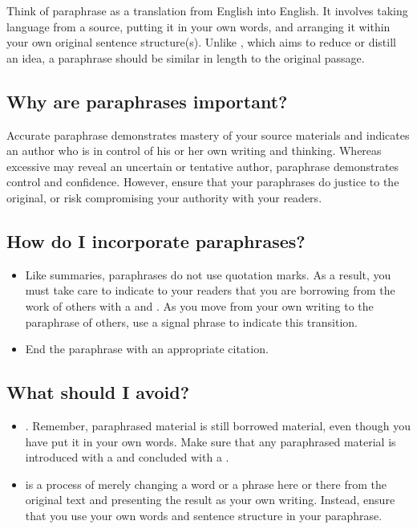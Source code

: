 Think of paraphrase as a translation from English into English. It involves
taking
language from a source, putting it in your own words, and arranging it within
your own original
sentence structure(s). Unlike \hyperlink{summary}{\color{Ahrenge}{summary}}, which aims to reduce or distill an
idea, a paraphrase should
be similar in length to the original passage.

\subsection{Why are paraphrases important?}

Accurate paraphrase demonstrates mastery of your source materials and
indicates an author who is in control of his or her own writing and thinking. Whereas excessive
\hyperlink{quotation}{\color{Ahrenge}{quotation}} may reveal an uncertain or tentative author, paraphrase demonstrates control and
confidence. However, ensure that your paraphrases do justice to the original, or risk compromising
your authority with your readers.

\subsection{How do I incorporate paraphrases?}

\begin{itemize}
\item Like summaries, paraphrases do not use quotation marks. As a result,
you must take care to indicate to your readers that you are borrowing from
the work of others with a \hyperlink{signalphrase}{\color{Ahrenge}{signal phrase}} and \hyperlink{citation}{\color{Ahrenge}{citation}}. As you move
from your own writing to the paraphrase of others, use a signal phrase to
indicate this transition.

\item End the paraphrase with an appropriate citation.

\end{itemize}

\subsection {What should I avoid?}

\begin{itemize}

\item {}. Remember, paraphrased material
is still borrowed material, even though you have put it in your own words. Make sure that any paraphrased material is introduced with a \hyperlink{signalphrase}{\color{Ahrenge}{signal phrase}} and concluded with a \hyperlink{citation}{\color{Ahrenge}{citation}}.

\item {} \hyperlink{patchwriting}{\color{Ahrenge}{Patchwriting}} is a process of merely changing a word or a phrase here or there from the original text and presenting the result as your own writing. Instead, ensure that you use your own words and sentence structure in your paraphrase.
\end{itemize}

